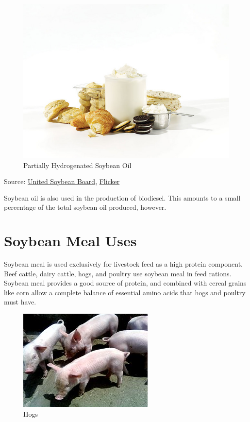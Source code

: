 \documentclass[
  letterpaper,
  DIV=11,
  numbers=noendperiod]{scrreprt}
\begin{document}
\begin{figure}

{\centering \includegraphics{images/hydrogenated_oil.jpg}

}

\caption{Partially Hydrogenated Soybean Oil}

\end{figure}

Source: \href{http://unitedsoybean.org/}{United Soybean Board},
\href{https://www.flickr.com/photos/unitedsoybean/16910795086/}{Flicker}

Soybean oil is also used in the production of biodiesel. This amounts to
a small percentage of the total soybean oil produced, however.

\hypertarget{soybean-meal-uses}{%
\section{Soybean Meal Uses}\label{soybean-meal-uses}}

Soybean meal is used exclusively for livestock feed as a high protein
component. Beef cattle, dairy cattle, hogs, and poultry use soybean meal
in feed rations. Soybean meal provides a good source of protein, and
combined with cereal grains like corn allow a complete balance of
essential amino acids that hogs and poultry must have.

\begin{figure}

{\centering \includegraphics{images/pigs.jpg}

}

\caption{Hogs}

\end{figure}
\end{document}
